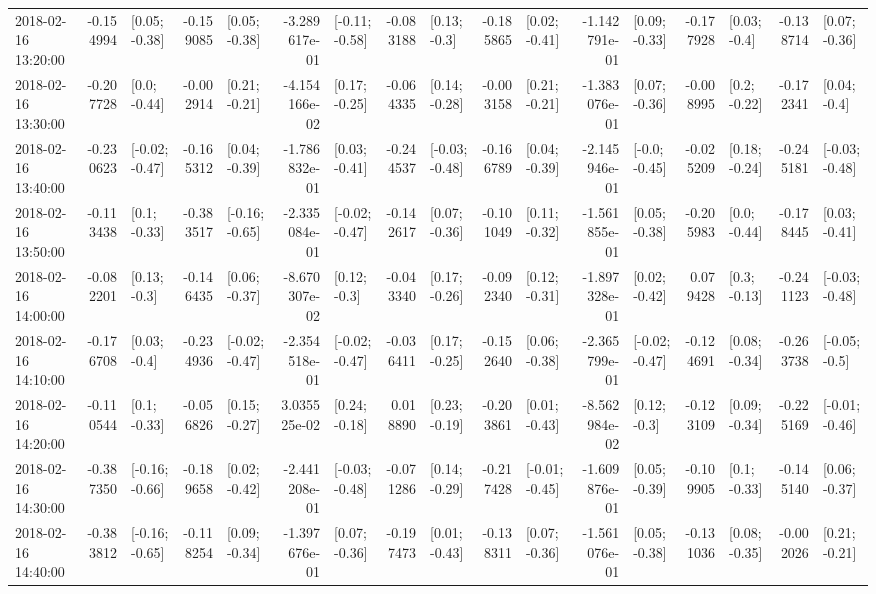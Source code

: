 \begin{tabular}{lrlrlrlrlrlrlrlrl}
2018-02-16 13:20:00 & -0.154994 &   [0.05; -0.38] & -0.159085 &   [0.05; -0.38] & -3.289617e-01 &  [-0.11; -0.58] & -0.083188 &    [0.13; -0.3] & -0.185865 &   [0.02; -0.41] & -1.142791e-01 &   [0.09; -0.33] & -0.177928 &    [0.03; -0.4] & -0.138714 &   [0.07; -0.36] \\
2018-02-16 13:30:00 & -0.207728 &    [0.0; -0.44] & -0.002914 &   [0.21; -0.21] & -4.154166e-02 &   [0.17; -0.25] & -0.064335 &   [0.14; -0.28] & -0.003158 &   [0.21; -0.21] & -1.383076e-01 &   [0.07; -0.36] & -0.008995 &    [0.2; -0.22] & -0.172341 &    [0.04; -0.4] \\
2018-02-16 13:40:00 & -0.230623 &  [-0.02; -0.47] & -0.165312 &   [0.04; -0.39] & -1.786832e-01 &   [0.03; -0.41] & -0.244537 &  [-0.03; -0.48] & -0.166789 &   [0.04; -0.39] & -2.145946e-01 &   [-0.0; -0.45] & -0.025209 &   [0.18; -0.24] & -0.245181 &  [-0.03; -0.48] \\
2018-02-16 13:50:00 & -0.113438 &    [0.1; -0.33] & -0.383517 &  [-0.16; -0.65] & -2.335084e-01 &  [-0.02; -0.47] & -0.142617 &   [0.07; -0.36] & -0.101049 &   [0.11; -0.32] & -1.561855e-01 &   [0.05; -0.38] & -0.205983 &    [0.0; -0.44] & -0.178445 &   [0.03; -0.41] \\
2018-02-16 14:00:00 & -0.082201 &    [0.13; -0.3] & -0.146435 &   [0.06; -0.37] & -8.670307e-02 &    [0.12; -0.3] & -0.043340 &   [0.17; -0.26] & -0.092340 &   [0.12; -0.31] & -1.897328e-01 &   [0.02; -0.42] &  0.079428 &    [0.3; -0.13] & -0.241123 &  [-0.03; -0.48] \\
2018-02-16 14:10:00 & -0.176708 &    [0.03; -0.4] & -0.234936 &  [-0.02; -0.47] & -2.354518e-01 &  [-0.02; -0.47] & -0.036411 &   [0.17; -0.25] & -0.152640 &   [0.06; -0.38] & -2.365799e-01 &  [-0.02; -0.47] & -0.124691 &   [0.08; -0.34] & -0.263738 &   [-0.05; -0.5] \\
2018-02-16 14:20:00 & -0.110544 &    [0.1; -0.33] & -0.056826 &   [0.15; -0.27] &  3.035525e-02 &   [0.24; -0.18] &  0.018890 &   [0.23; -0.19] & -0.203861 &   [0.01; -0.43] & -8.562984e-02 &    [0.12; -0.3] & -0.123109 &   [0.09; -0.34] & -0.225169 &  [-0.01; -0.46] \\
2018-02-16 14:30:00 & -0.387350 &  [-0.16; -0.66] & -0.189658 &   [0.02; -0.42] & -2.441208e-01 &  [-0.03; -0.48] & -0.071286 &   [0.14; -0.29] & -0.217428 &  [-0.01; -0.45] & -1.609876e-01 &   [0.05; -0.39] & -0.109905 &    [0.1; -0.33] & -0.145140 &   [0.06; -0.37] \\
2018-02-16 14:40:00 & -0.383812 &  [-0.16; -0.65] & -0.118254 &   [0.09; -0.34] & -1.397676e-01 &   [0.07; -0.36] & -0.197473 &   [0.01; -0.43] & -0.138311 &   [0.07; -0.36] & -1.561076e-01 &   [0.05; -0.38] & -0.131036 &   [0.08; -0.35] & -0.002026 &   [0.21; -0.21] \\

\end{tabular}
